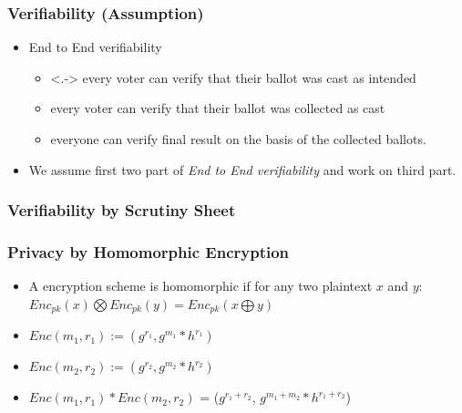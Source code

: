 \documentclass{beamer}
\begin{document}
\begin{frame}
\frametitle{Verifiability (Assumption)}
\begin{itemize}
\item End to End verifiability
\begin{itemize}
  \item<.-> every voter can verify that their ballot was cast as
  intended
  \item every voter can verify that their ballot was collected as
  cast
  \item everyone can verify final result on the basis of the
  collected ballots.
\end{itemize}

\item We assume first two part of \textit{End to End verifiability} and work on
      third part.
\end{itemize}
\end{frame}



\begin{frame}
\frametitle{Verifiability by Scrutiny Sheet}
\lstnineth
\end{frame}


\begin{frame}
\frametitle{Privacy by Homomorphic Encryption}
\begin{itemize}
\item A encryption scheme is homomorphic if for any two plaintext $x$ and $y$:
$Enc_{pk}(x) \bigotimes Enc_{pk}(y) = Enc_{pk} (x \bigoplus y)$
\item $Enc(m_{1}, r_{1}) := (g^{r_{1}}, g^{m_{1}} *  h^{r_{1}})$ 
\item $Enc(m_{2}, r_{2}) := (g^{r_{2}}, g^{m_{2}} *  h^{r_{2}})$
\item  $Enc(m_{1}, r_{1})  * Enc(m_{2}, r_{2}) $ =  ($g^{r_{1} + r_{2}}$, $g^{m_{1} + m_{2}} * h^{r_{1} + r_{2}}$) 		
		
\end{itemize}
\end{frame}
\end{document}
